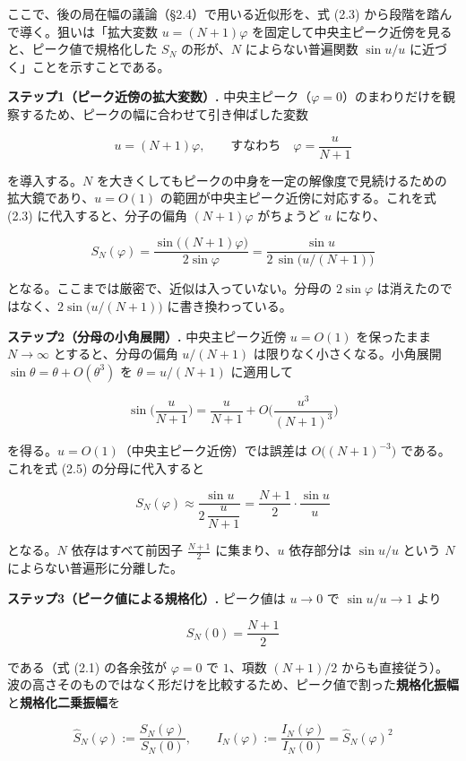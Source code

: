 \documentclass[
]{ltjsarticle}
\begin{document}
ここで、後の局在幅の議論（§2.4）で用いる近似形を、式 (2.3)
から段階を踏んで導く。狙いは「拡大変数 \(u=(N+1)\varphi\)
を固定して中央主ピーク近傍を見ると、ピーク値で規格化した \(S_N\)
の形が、\(N\) によらない普遍関数 \(\sin u/u\)
に近づく」ことを示すことである。

\textbf{ステップ1（ピーク近傍の拡大変数）.}
中央主ピーク（\(\varphi=0\)）のまわりだけを観察するため、ピークの幅に合わせて引き伸ばした変数

\[
u=(N+1)\varphi,\qquad\text{すなわち}\quad \varphi=\frac{u}{N+1}
\tag{2.4}
\]

を導入する。\(N\)
を大きくしてもピークの中身を一定の解像度で見続けるための拡大鏡であり、\(u=O(1)\)
の範囲が中央主ピーク近傍に対応する。これを式 (2.3)
に代入すると、分子の偏角 \((N+1)\varphi\) がちょうど \(u\) になり、

\[
S_N(\varphi)=\frac{\sin\!\big((N+1)\varphi\big)}{2\sin\varphi}
=\frac{\sin u}{2\,\sin\!\big(u/(N+1)\big)}
\tag{2.5}
\]

となる。ここまでは厳密で、近似は入っていない。分母の \(2\sin\varphi\)
は消えたのではなく、\(2\sin\!\big(u/(N+1)\big)\) に書き換わっている。

\textbf{ステップ2（分母の小角展開）.} 中央主ピーク近傍 \(u=O(1)\)
を保ったまま \(N\to\infty\) とすると、分母の偏角 \(u/(N+1)\)
は限りなく小さくなる。小角展開 \(\sin\theta=\theta+O(\theta^3)\) を
\(\theta=u/(N+1)\) に適用して

\[
\sin\!\Big(\frac{u}{N+1}\Big)=\frac{u}{N+1}+O\!\Big(\frac{u^3}{(N+1)^3}\Big)
\tag{2.6}
\]

を得る。\(u=O(1)\)（中央主ピーク近傍）では誤差は
\(O\!\big((N+1)^{-3}\big)\) である。これを式 (2.5) の分母に代入すると

\[
S_N(\varphi)\approx\frac{\sin u}{2\,\dfrac{u}{N+1}}
=\frac{N+1}{2}\cdot\frac{\sin u}{u}
\tag{2.7}
\]

となる。\(N\) 依存はすべて前因子 \(\tfrac{N+1}{2}\) に集まり、\(u\)
依存部分は \(\sin u/u\) という \(N\) によらない普遍形に分離した。

\textbf{ステップ3（ピーク値による規格化）.} ピーク値は \(u\to0\) で
\(\sin u/u\to1\) より

\[
S_N(0)=\frac{N+1}{2}
\tag{2.8}
\]

である（式 (2.1) の各余弦が \(\varphi=0\) で \(1\)、項数 \((N+1)/2\)
からも直接従う）。波の高さそのものではなく形だけを比較するため、ピーク値で割った\textbf{規格化振幅}と\textbf{規格化二乗振幅}を

\[
\widehat{S}_N(\varphi):=\frac{S_N(\varphi)}{S_N(0)},
\qquad
\widehat{I}_N(\varphi):=\frac{I_N(\varphi)}{I_N(0)}=\widehat{S}_N(\varphi)^2
\]
\end{document}
